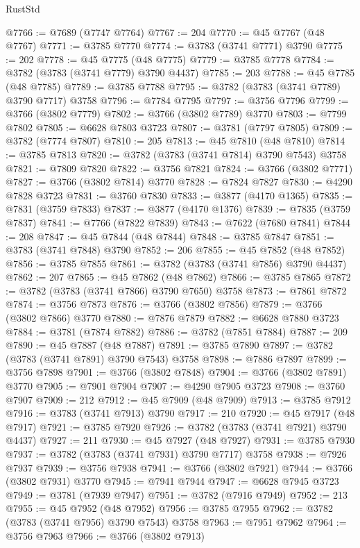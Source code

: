 \begin{lexlean}{RustStd}
\begin{coremodule}
@7766 := @7689 (@7747 @7764)
@7767 := 204
@7770 := @45 @7767 (@48 @7767)
@7771 := @3785 @7770
@7774 := @3783 (@3741 @7771) @3790
@7775 := 202
@7778 := @45 @7775 (@48 @7775)
@7779 := @3785 @7778
@7784 := @3782 (@3783 (@3741 @7779) @3790 @4437)
@7785 := 203
@7788 := @45 @7785 (@48 @7785)
@7789 := @3785 @7788
@7795 := @3782 (@3783 (@3741 @7789) @3790 @7717) @3758
@7796 := @7784 @7795
@7797 := @3756 @7796
@7799 := @3766 (@3802 @7779)
@7802 := @3766 (@3802 @7789) @3770
@7803 := @7799 @7802
@7805 := @6628 @7803 @3723
@7807 := @3781 (@7797 @7805)
@7809 := @3782 (@7774 @7807)
@7810 := 205
@7813 := @45 @7810 (@48 @7810)
@7814 := @3785 @7813
@7820 := @3782 (@3783 (@3741 @7814) @3790 @7543) @3758
@7821 := @7809 @7820
@7822 := @3756 @7821
@7824 := @3766 (@3802 @7771)
@7827 := @3766 (@3802 @7814) @3770
@7828 := @7824 @7827
@7830 := @4290 @7828 @3723
@7831 := @3760 @7830
@7833 := @3877 (@4170 @1365)
@7835 := @7831 (@3759 @7833)
@7837 := @3877 (@4170 @1376)
@7839 := @7835 (@3759 @7837)
@7841 := @7766 (@7822 @7839)
@7843 := @7622 (@7680 @7841)
@7844 := 208
@7847 := @45 @7844 (@48 @7844)
@7848 := @3785 @7847
@7851 := @3783 (@3741 @7848) @3790
@7852 := 206
@7855 := @45 @7852 (@48 @7852)
@7856 := @3785 @7855
@7861 := @3782 (@3783 (@3741 @7856) @3790 @4437)
@7862 := 207
@7865 := @45 @7862 (@48 @7862)
@7866 := @3785 @7865
@7872 := @3782 (@3783 (@3741 @7866) @3790 @7650) @3758
@7873 := @7861 @7872
@7874 := @3756 @7873
@7876 := @3766 (@3802 @7856)
@7879 := @3766 (@3802 @7866) @3770
@7880 := @7876 @7879
@7882 := @6628 @7880 @3723
@7884 := @3781 (@7874 @7882)
@7886 := @3782 (@7851 @7884)
@7887 := 209
@7890 := @45 @7887 (@48 @7887)
@7891 := @3785 @7890
@7897 := @3782 (@3783 (@3741 @7891) @3790 @7543) @3758
@7898 := @7886 @7897
@7899 := @3756 @7898
@7901 := @3766 (@3802 @7848)
@7904 := @3766 (@3802 @7891) @3770
@7905 := @7901 @7904
@7907 := @4290 @7905 @3723
@7908 := @3760 @7907
@7909 := 212
@7912 := @45 @7909 (@48 @7909)
@7913 := @3785 @7912
@7916 := @3783 (@3741 @7913) @3790
@7917 := 210
@7920 := @45 @7917 (@48 @7917)
@7921 := @3785 @7920
@7926 := @3782 (@3783 (@3741 @7921) @3790 @4437)
@7927 := 211
@7930 := @45 @7927 (@48 @7927)
@7931 := @3785 @7930
@7937 := @3782 (@3783 (@3741 @7931) @3790 @7717) @3758
@7938 := @7926 @7937
@7939 := @3756 @7938
@7941 := @3766 (@3802 @7921)
@7944 := @3766 (@3802 @7931) @3770
@7945 := @7941 @7944
@7947 := @6628 @7945 @3723
@7949 := @3781 (@7939 @7947)
@7951 := @3782 (@7916 @7949)
@7952 := 213
@7955 := @45 @7952 (@48 @7952)
@7956 := @3785 @7955
@7962 := @3782 (@3783 (@3741 @7956) @3790 @7543) @3758
@7963 := @7951 @7962
@7964 := @3756 @7963
@7966 := @3766 (@3802 @7913)

\end{coremodule}
\end{lexlean}
